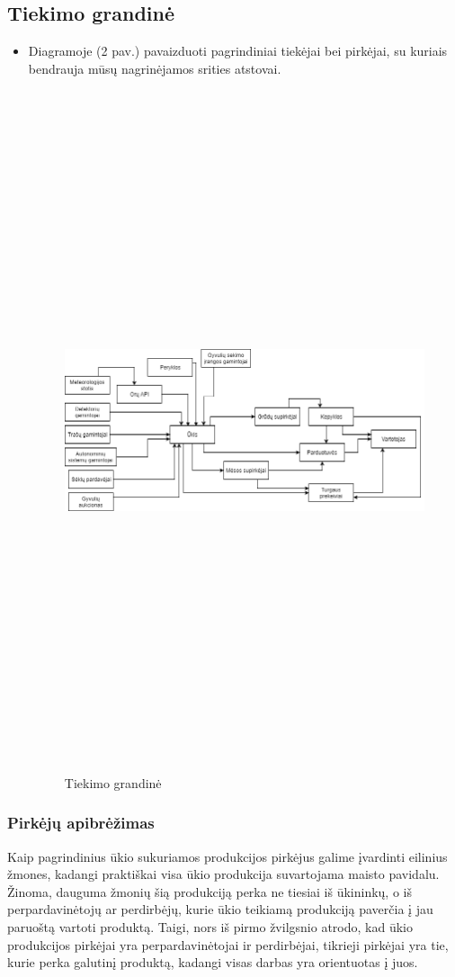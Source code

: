 \documentclass[oneside]{VUMIFPSkursinis}
\begin{document}
	\subsection{Tiekimo grandinė}
	\begin{itemize}
\item Diagramoje (2 pav.) pavaizduoti pagrindiniai tiekėjai bei pirkėjai, su kuriais bendrauja mūsų nagrinėjamos srities atstovai.
		\begin{figure}[H]
		\centering	
	\includegraphics[width=18cm,height=20cm,keepaspectratio]{supplyChain.png}
	\caption{Tiekimo grandinė}
	\label{fig:supplyChain}
\end{figure}
\end{itemize}
\subsubsection{Pirkėjų apibrėžimas}
Kaip pagrindinius ūkio sukuriamos produkcijos pirkėjus galime įvardinti eilinius žmones, kadangi praktiškai visa ūkio produkcija suvartojama maisto pavidalu. Žinoma, dauguma žmonių šią produkciją perka ne tiesiai iš ūkininkų, o iš perpardavinėtojų ar perdirbėjų, kurie ūkio teikiamą produkciją paverčia į jau paruoštą vartoti produktą. Taigi, nors iš pirmo žvilgsnio atrodo, kad ūkio produkcijos pirkėjai yra perpardavinėtojai ir perdirbėjai, tikrieji pirkėjai yra tie, kurie perka galutinį produktą, kadangi visas darbas yra orientuotas į juos.
\end{document}
